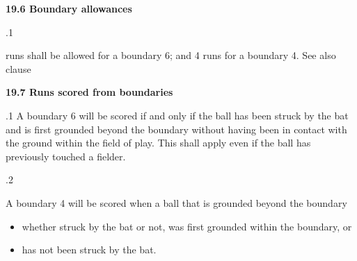 \documentclass[12pt]{article}
\begin{document}
\vspace{\baselineskip}
{\fontsize{11pt}{13.2pt}\selectfont \textbf{19.6 \tabto{0.47in} Boundary allowances}\par}\par


\vspace{\baselineskip}
{\fontsize{9pt}{10.8pt}.1 \tabto{0.49in} {\fontsize{8pt}{9.6pt} runs shall be allowed for a boundary 6; and 4 runs for a boundary 4. See also clause \par}\par}\par


\vspace{\baselineskip}
{\fontsize{11pt}{13.2pt}\selectfont \textbf{19.7 \tabto{0.47in} Runs scored from boundaries}\par}\par


\vspace{\baselineskip}
\begin{adjustwidth}{0.5in}{0.0in}
{\fontsize{9pt}{10.8pt}.1 \tabto{0.49in} A boundary 6 will be scored if and only if the ball has been struck by the bat and is first grounded beyond the boundary without having been in contact with the ground within the field of play. This shall apply even if the ball has previously touched a fielder.\par}\par

\end{adjustwidth}


\vspace{\baselineskip}
{\fontsize{9pt}{10.8pt}.2 \tabto{0.49in} {\fontsize{8pt}{9.6pt}\selectfont A boundary 4 will be scored when a ball that is grounded beyond the boundary\par}\par}\par


\vspace{\baselineskip}
\begin{itemize}
	\item {\fontsize{9pt}{10.8pt}\selectfont whether struck by the bat or not, was first grounded within the boundary, or\par}\par


\vspace{\baselineskip}
	\item {\fontsize{9pt}{10.8pt}\selectfont has not been struck by the bat.\par}
\end{itemize}\par
\end{document}
